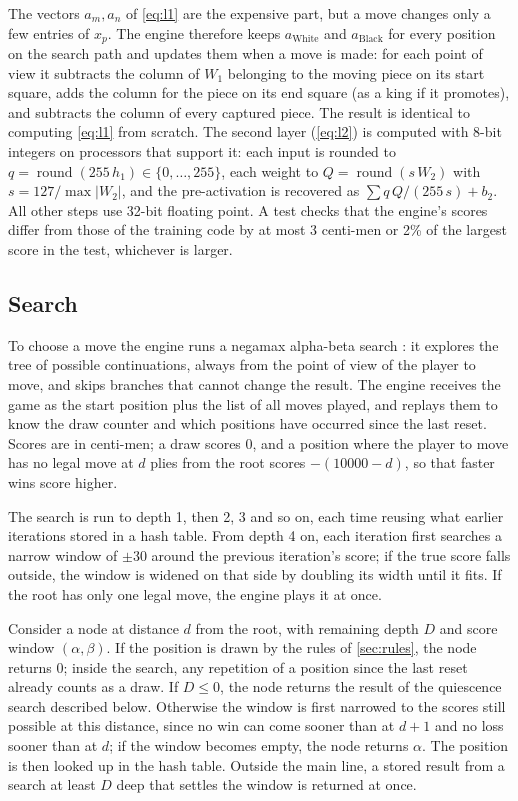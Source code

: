 The vectors $a_m, a_n$ of \cref{eq:l1} are the expensive part, but a move changes
only a few entries of $x_p$. The engine therefore keeps $a_{\text{White}}$ and
$a_{\text{Black}}$ for every position on the search path and updates them when a
move is made: for each point of view it subtracts the column of $W_1$ belonging
to the moving piece on its start square, adds the column for the piece on its end
square (as a king if it promotes), and subtracts the column of every captured
piece. The result is identical to computing \cref{eq:l1} from scratch. The second
layer (\cref{eq:l2}) is computed with 8-bit integers on processors that support
it: each input is rounded to $q = \operatorname{round}(255\,h_1) \in
\{0,\dots,255\}$, each weight to $Q = \operatorname{round}(s\,W_2)$ with
$s = 127/\max|W_2|$, and the pre-activation is recovered as
$\sum q\,Q / (255\,s) + b_2$. All other steps use 32-bit floating point. A test
checks that the engine's scores differ from those of the training code by at most
3 centi-men or 2\% of the largest score in the test, whichever is larger.

\subsection{Search}\label{sec:search}

To choose a move the engine runs a negamax alpha-beta search
\parencite{knuth1975}: it explores the tree of possible continuations, always
from the point of view of the player to move, and skips branches that cannot
change the result. The engine receives the game as the start position plus the
list of all moves played, and replays them to know the draw counter and which
positions have occurred since the last reset. Scores are in centi-men; a draw
scores 0, and a position where the player to move has no legal move at $d$ plies
from the root scores $-(10000 - d)$, so that faster wins score higher.

The search is run to depth 1, then 2, 3 and so on, each time reusing what earlier
iterations stored in a hash table. From depth 4 on, each iteration first searches
a narrow window of $\pm30$ around the previous iteration's score; if the true
score falls outside, the window is widened on that side by doubling its width
until it fits. If the root has only one legal move, the engine plays it at once.

Consider a node at distance $d$ from the root, with remaining depth $D$ and score
window $(\alpha,\beta)$. If the position is drawn by the rules of
\cref{sec:rules}, the node returns 0; inside the search, any repetition of a
position since the last reset already counts as a draw. If $D \le 0$, the node
returns the result of the quiescence search described below. Otherwise the
window is first narrowed to the scores still possible at this distance, since no
win can come sooner than at $d+1$ and no loss sooner than at $d$; if the window
becomes empty, the node returns $\alpha$. The position is then looked up in the
hash table. Outside the main line, a stored result from a search at least $D$
deep that settles the window is returned at once.

